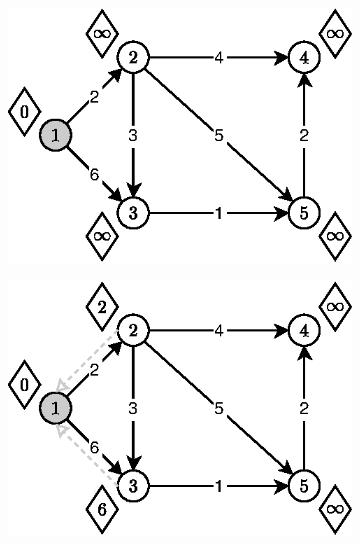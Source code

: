 \begin{figure}[!htbp]
	\centering
	\begin{subfigure}[b]{0.24\textwidth}
		\includegraphics[width=\textwidth]{Chapter_I/11/1_11a.eps}
		\caption{}
	\end{subfigure}%
	\begin{subfigure}[b]{0.24\textwidth}
		\includegraphics[width=\textwidth]{Chapter_I/11/1_11b.eps}
		\caption{}
	\end{subfigure}
	\begin{subfigure}[b]{0.24\textwidth}

\end{subfigure}
\end{figure}
